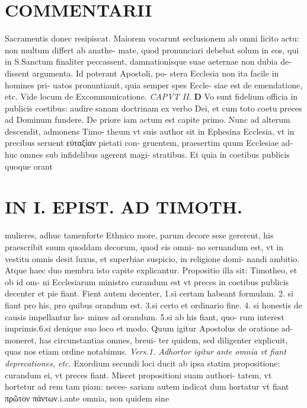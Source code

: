 \documentclass{article}
\begin{document}
\begin{pages}
\section*{COMMENTARII }
\marginpar{[ p.42 ]}\pstart Sacramentis donec resipiscat.  \pend\pstart Maiorem vocarunt seclusionem ab omni licito actu: non multum differt ab anathe- mate, quod pronunciari debebat solum in eos, qui in S.Sanctum finaliter peccassent, damnationisque suae aeternae non dubia de- dissent argumenta. Id poterant Apostoli, po- stera Ecclesia non ita facile in homines pri- uatos pronuntiauit, quia semper spes Eccle- siae est de emendatione, etc. Vide locum de Excommunicatione.  \pend
\textit{CAPVT II. }
\textbf{D }\pstart Vo sunt fidelium officia in publicis coetibus: audire sanam doctrinam ex verbo Dei, et cum toto coetu preces ad Dominum fundere. De priore iam actum est capite primo. Nunc ad alterum descendit, admonens Timo- theum vt suis author sit in Ephesina Ecclesia, vt in precibus seruent εὐταξίαν pietati con- gruentem, praesertim quum Ecclesiae ad- huc omnes sub infidelibus agerent magi- stratibus.  \pend\pstart Et quia in coetibus publicis quoque orant  \pend
\section*{IN I. EPIST. AD TIMOTH. }
\marginpar{[ p.33 ]}\pstart mulieres, adhuc tamenforte Ethnico more, parum decore sese gererent, his praescribit suum quoddam decorum, quod eis omni- no seruandum est, vt in vestitu omnis desit luxus, et superbiae suspicio, in religione domi- nandi ambitio. Atque haec duo membra isto capite explicantur.  \pend\pstart Propositio illa sit: Timotheo, et ob id om- ni Ecclesiarum ministro curandum est vt preces in coetibus publicis decenter et pie fiant. Fient autem decenter, 1.si certam habeant formulam. 2. si fiant pro his, pro quibus orandum est. 3.si certo et ordinario fine. 4. si honestis de causis impellantur ho- mines ad orandum. 5.si ab his fiant, quo- rum interest imprimis.6.si denique suo loco et modo.  \pend\pstart Quum igitur Apostolus de oratione ad- moneret, has circunstantias omnes, breui- ter quidem, sed diligenter explicuit, quas nos etiam ordine notabimus.  \pend
\textit{Vers.1. Adhortor igitur ante omnia vt fiant deprecationes, etc. }\pstart Exordium secundi loci ducit ab ipsa statim propositione: curandum ei, vt preces fiant. Miscet propositioni suam authori- tatem, vt hortetur ad rem tam piam: neces- sariam autem indicat dum hortatur vt fiant πρῶτον πάντων.i.ante omnia, non quidem sine  \pend

\end{pages}
\end{document}
